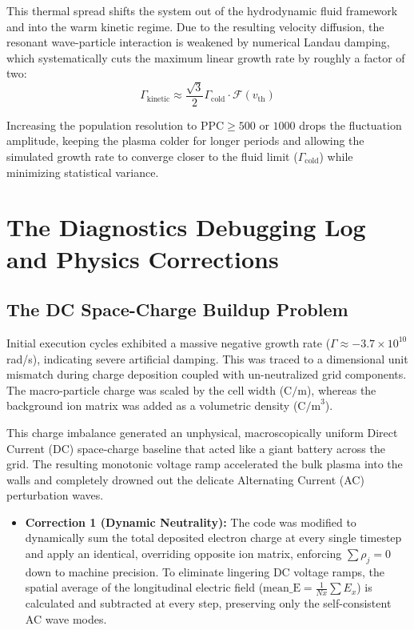 \documentclass[11pt,a4paper]{article}
\begin{document}
This thermal spread shifts the system out of the hydrodynamic fluid framework and into the warm kinetic regime. Due to the resulting velocity diffusion, the resonant wave-particle interaction is weakened by numerical Landau damping, which systematically cuts the maximum linear growth rate by roughly a factor of two:
\begin{equation}
\Gamma_{\text{kinetic}} \approx \frac{\sqrt{3}}{2} \Gamma_{\text{cold}} \cdot \mathcal{F}(v_{\text{th}})
\end{equation}

Increasing the population resolution to $\text{PPC} \ge 500$ or $1000$ drops the fluctuation amplitude, keeping the plasma colder for longer periods and allowing the simulated growth rate to converge closer to the fluid limit ($\Gamma_{\text{cold}}$) while minimizing statistical variance.

\section{The Diagnostics Debugging Log and Physics Corrections}

\subsection{The DC Space-Charge Buildup Problem}
Initial execution cycles exhibited a massive negative growth rate ($\Gamma \approx -3.7 \times 10^{10}$ rad/s), indicating severe artificial damping. This was traced to a dimensional unit mismatch during charge deposition coupled with un-neutralized grid components. The macro-particle charge was scaled by the cell width ($\text{C/m}$), whereas the background ion matrix was added as a volumetric density ($\text{C/m}^3$).

This charge imbalance generated an unphysical, macroscopically uniform Direct Current (DC) space-charge baseline that acted like a giant battery across the grid. The resulting monotonic voltage ramp accelerated the bulk plasma into the walls and completely drowned out the delicate Alternating Current (AC) perturbation waves. 
\begin{itemize}
    \item \textbf{Correction 1 (Dynamic Neutrality):} The code was modified to dynamically sum the total deposited electron charge at every single timestep and apply an identical, overriding opposite ion matrix, enforcing $\sum \rho_j = 0$ down to machine precision.
     To eliminate lingering DC voltage ramps, the spatial average of the longitudinal electric field ($\text{mean\_E} = \frac{1}{Nx}\sum E_x$) is calculated and subtracted at every step, preserving only the self-consistent AC wave modes.
\end{itemize}
\end{document}
